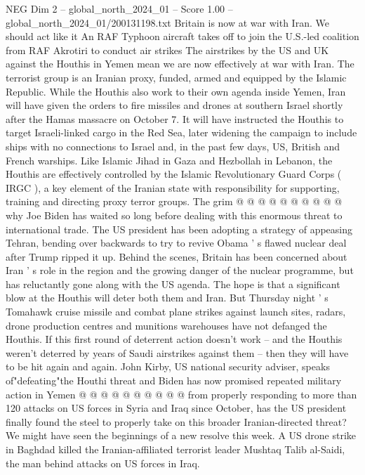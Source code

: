 \begin{textsample}{NEG Dim 2 – global\_north\_2024\_01 – Score 1.00 – global\_north\_2024\_01/200131198.txt}  \label{ex:f2_neg_240}
Britain is now at war with Iran.
We should act like it An RAF Typhoon aircraft takes off to join the U.S.-led coalition from RAF Akrotiri to conduct air strikes The airstrikes by the US and UK against the Houthis in Yemen mean we are now effectively at war with Iran.
The terrorist group is an Iranian proxy, funded, armed and equipped by the Islamic Republic.
While the Houthis also work to their own agenda inside Yemen, Iran will have given the orders to fire missiles and drones at southern Israel shortly after the Hamas massacre on October 7.
It will have instructed the Houthis to target Israeli-linked cargo in the Red Sea, later widening the campaign to include ships with no connections to Israel and, in the past few days, US, British and French warships.
Like Islamic Jihad in Gaza and Hezbollah in Lebanon, the Houthis are effectively controlled by the Islamic Revolutionary Guard Corps ( IRGC ), a key element of the Iranian state with responsibility for supporting, training and directing proxy terror groups.
The grim @ @ @ @ @ @ @ @ @ @ why Joe Biden has waited so long before dealing with this enormous threat to international trade.
The US president has been adopting a strategy of appeasing Tehran, bending over backwards to try to revive Obama ' s flawed nuclear deal after Trump ripped it up.
Behind the scenes, Britain has been concerned about Iran ' s role in the region and the growing danger of the nuclear programme, but has reluctantly gone along with the US agenda.
The hope is that a significant blow at the Houthis will deter both them and Iran.
But Thursday night ' s Tomahawk cruise missile and combat plane strikes against launch sites, radars, drone production centres and munitions warehouses have not defanged the Houthis.
If this first round of deterrent action doesn't work -- and the Houthis weren't deterred by years of Saudi airstrikes against them -- then they will have to be hit again and again.
John Kirby, US national security adviser, speaks of"defeating"the Houthi threat and Biden has now promised repeated military action in Yemen @ @ @ @ @ @ @ @ @ @ from properly responding to more than 120 attacks on US forces in Syria and Iraq since October, has the US president finally found the steel to properly take on this broader Iranian-directed threat?
We might have seen the beginnings of a new resolve this week.
A US drone strike in Baghdad killed the Iranian-affiliated terrorist leader Mushtaq Talib al-Saidi, the man behind attacks on US forces in Iraq.

\end{textsample}
